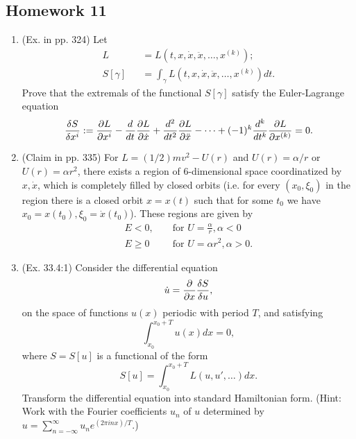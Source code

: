 \subsection{Homework 11}
\begin{enumerate}
	\item (Ex. in pp. 324) Let
	\begin{eqnarray}
	L &&= L(t, x, \dot{x}, \ddot{x}, \dots, x^{(k)});
	\nonumber\\
	S[\gamma] &&= \int_{\gamma} L(t, x, \dot{x}, \ddot{x}, \dots, x^{(k)}) dt.
	\end{eqnarray}
	Prove that the extremals of the functional $S[\gamma]$ satisfy the Euler-Lagrange equation
	\begin{eqnarray}
		\frac{\delta S}{\delta x^i} := \pardiff{L}{x^i} - \diff{}{t}\pardiff{L}{\dot{x}} + \diff[2]{ }{t} \pardiff{L}{\ddot{x}} - \cdots + (-1)^k \diff[k]{ }{t} \pardiff{L}{x^{(k)}} = 0.
	\end{eqnarray}
	
	\item (Claim in pp. 335) For $L = (1/2)mv^2 - U(r)$ and $U(r) = \alpha/r$ or $U(r) = \alpha r^2$, there exists a region of 6-dimensional space coordinatized by $x, \dot{x}$, which is completely filled by closed orbits (i.e. for every $(x_0, \xi_0)$ in the region there is a closed orbit $x = x(t)$ such that for some $t_0$ we have $x_0 = x(t_0), \xi_0 = \dot{x}(t_0)$). These regions are given by
	\begin{eqnarray}
		E < 0, && \text{ for } U = \frac{\alpha}{r}, \alpha < 0
		\nonumber\\
		E \geq 0 && \text{ for } U = \alpha r^2, \alpha > 0.
		\nonumber 
	\end{eqnarray}
	
	\item (Ex. 33.4:1) Consider the differential equation \[ \dot{u} = \pardiff{ }{x} \frac{\delta S}{\delta u}, \] on the space of functions $u(x)$ periodic with period $T$, and satisfying \[ \int_{x_0}^{x_0+T} u(x) dx = 0, \] where $S = S[u]$ is a functional of the form \[ S[u] = \int_{x_0}^{x_0+T} L(u, u', \dots) dx. \] Transform the differential equation into standard Hamiltonian form. (Hint: Work with the Fourier coefficients $u_n$ of $u$ determined by $u = \sum_{n = -\infty}^{\infty} u_n e^{(2 \pi i n x)/T} $.)
	

\end{enumerate}
